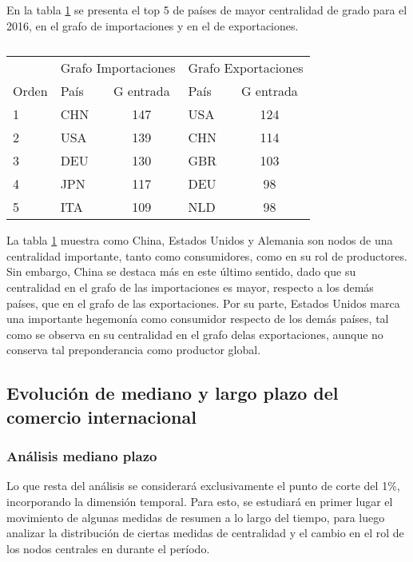\documentclass[class=article, crop=false]{standalone}
\begin{document}
En la tabla \ref{Table: Tabla1} se presenta el top 5 de países de mayor centralidad de grado para el 2016, en el grafo de importaciones y en el de exportaciones.

\begin{table}
	\centering
	\caption{}
	\label{Table: Tabla1}
	\begin{tabular}{l|lc|lc|}
		& \multicolumn{2}{l|}{Grafo Importaciones} &  \multicolumn{2}{l|}{Grafo Exportaciones} \\
		Orden &           País &          G \degree  entrada &           País & G \degree  entrada          \\
		\hline
		1\degree &           CHN &          147 &           USA & 124         \\
		2\degree &           USA &          139 &           CHN & 114         \\
		3\degree &           DEU &          130 &           GBR & 103         \\
		4\degree &           JPN &          117 &           DEU & 98         \\
		5\degree &           ITA &          109 &           NLD & 98        
	\end{tabular}
\end{table}

La tabla \ref{Table: Tabla1} muestra como China, Estados Unidos y Alemania son nodos de una centralidad importante, tanto como consumidores, como en su rol de productores. Sin embargo, China se destaca más en este último sentido, dado que su centralidad en el grafo de las importaciones es mayor, respecto a los demás países, que en el grafo de las exportaciones. Por su parte, Estados  Unidos marca una importante hegemonía como consumidor respecto de los demás países, tal como se observa en su centralidad en el grafo delas exportaciones, aunque no conserva tal preponderancia como productor global. 

\subsection{Evolución de mediano y largo plazo del comercio internacional}

\subsubsection{Análisis mediano plazo}

Lo que resta del análisis se considerará exclusivamente el punto de corte del 1\%, incorporando la dimensión temporal. Para esto, se estudiará en primer lugar el movimiento de algunas medidas de resumen a lo largo del tiempo, para luego analizar la distribución de ciertas medidas de centralidad y el cambio en el rol de los nodos centrales en durante el período.
\end{document}
